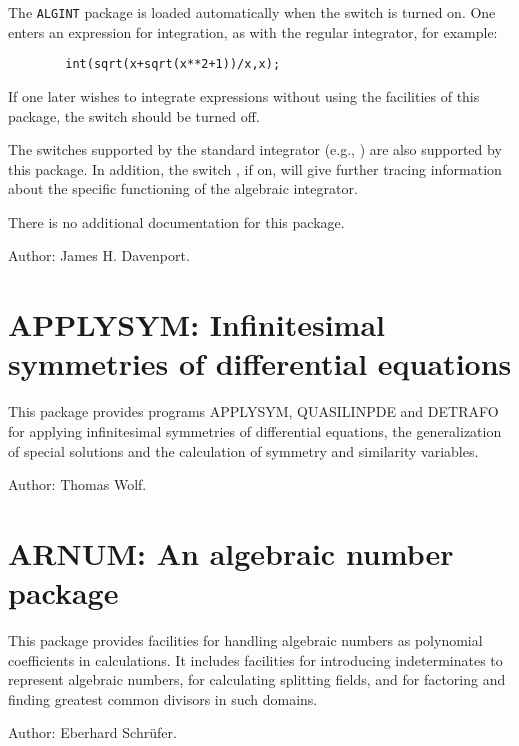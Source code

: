 \hypertarget{switch:ALGINT}{}
The \texttt{ALGINT} package is loaded automatically when the switch 
is turned on.  
One enters an expression for integration, as with the regular integrator,
for example:
\begin{verbatim}
        int(sqrt(x+sqrt(x**2+1))/x,x);
\end{verbatim}
If one later wishes to integrate expressions without using the facilities of
this package, the switch   should be turned
off. 

\hypertarget{switch:TRA}{}
The switches supported by the standard integrator (e.g., )
 are also supported by this package.  In addition, the
switch ,  if on, will give further tracing
information about the specific functioning of the algebraic integrator.

There is no additional documentation for this package.

Author: James H. Davenport.

\newpage

\section{APPLYSYM: Infinitesimal symmetries of differential equations}

This package provides programs APPLYSYM, QUASILINPDE and DETRAFO for
applying infinitesimal symmetries of differential equations, the
generalization of special solutions and the calculation of symmetry and
similarity variables.

Author: Thomas Wolf.


\newpage

\section{ARNUM: An algebraic number package} 

This package provides facilities for handling algebraic numbers as
polynomial coefficients in {\REDUCE} calculations. It includes facilities for
introducing indeterminates to represent algebraic numbers, for calculating
splitting fields, and for factoring and finding greatest common divisors
in such domains.

Author: Eberhard Schr\"ufer.


\newpage

